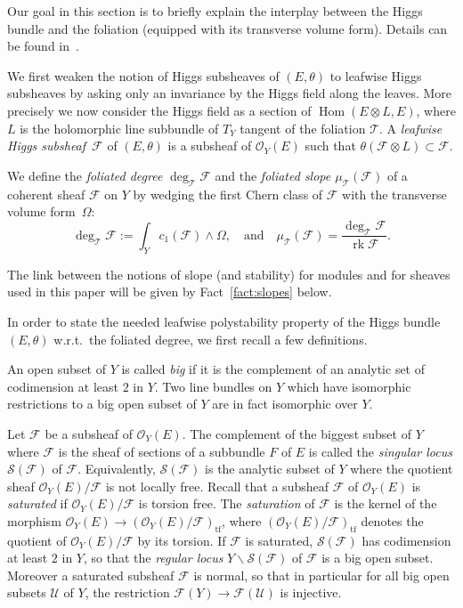 \documentclass[JEP,XML,SOM,Unicode,NoFloatCountersInSection]{cedram}
\let\mathcal\mathscr
\newcommand{\citestar}[3]{\cite[#3]{#1}}
\theoremstyle{plain}
\theoremstyle{definition}
\DeclareMathOperator{\Hom}{Hom}
\DeclareMathOperator{\rk}{rk}
\newcommand{\rtf}{\mathrm{tf}}
\newcommand{\cF}{\mathcal{F}}
\newcommand{\cO}{\mathcal{O}}
\newcommand{\cS}{\mathcal{S}}
\newcommand{\cT}{\mathcal{T}}
\newcommand{\cU}{\mathcal{U}}
\begin{document}
Our goal in this section is to briefly explain the interplay between the Higgs bundle and the
foliation (equipped with its transverse volume form).
Details can be found in~\citestar{KM}*{}.

We first weaken the notion of Higgs subsheaves of $(E,\theta)$ to leafwise Higgs subsheaves by
asking only an
invariance by the Higgs field along the leaves. More \hbox{precisely} we now consider the
Higgs field as a section of $\Hom(E\otimes L,E)$,
where $L$ is the holomorphic
line subbundle of $T_Y$ tangent of the foliation $\cT$.
A \emph{leafwise Higgs subsheaf}~$\cF$ of
$(E,\theta)$ is a subsheaf of $\cO_Y(E)$ such that $\theta(\cF\otimes L)\subset \cF$.

We define the \emph{foliated degree} $\deg_\cT\cF$ and the {\em
foliated slope $\mu_\cT(\cF)$} of a coherent sheaf
$\cF$ on $Y$ by
wedging the first Chern class of $\cF$ with the transverse volume form~$\Omega$:
$$
\deg_\cT\cF:=\int_Y c_1(\cF)\wedge\Omega, \quad\mbox{and}\quad \mu_\cT(\cF)=\frac{\deg_\cT\cF}{\rk \cF}.
$$

The link between the notions of slope (and stability) for modules and for sheaves used in
this paper will be given by Fact~\ref{fact:slopes} below.

In order to state the needed leafwise polystability property of the Higgs bundle $(E,\theta)$ w.r.t.\ the
foliated degree, we first recall a few definitions.

An open subset of $Y$ is called \emph{big} if it is the complement of an analytic set of
codimension at least $2$ in $Y$. Two line bundles on $Y$ which have isomorphic restrictions
to a big open subset of $Y$ are in fact isomorphic over $Y$.

Let $\cF$ be a subsheaf of $\cO_Y(E)$. The complement of the biggest subset of $Y$ where $\cF$ is the
sheaf of sections of a subbundle $F$ of $E$ is called the \emph{singular locus} $\cS(\cF)$ of
$\cF$. Equivalently, $\cS(\cF)$ is the analytic subset of $Y$ where the quotient sheaf $\cO_Y(E)/\cF$ is not locally
free. Recall that a subsheaf $\cF$ of $\cO_Y(E)$ is \emph{saturated} if $\cO_Y(E)/\cF$ is torsion
free. The \emph{saturation} of $\cF$ is the kernel of the morphism $\cO_Y(E) \to
(\cO_Y(E)/\cF)_\rtf$, where
$(\cO_Y(E)/\cF)_\rtf$ denotes the quotient of $\cO_Y(E)/\cF$ by its torsion. If $\cF$ is
saturated, $\cS(\cF)$ has codimension at least $2$ in $Y$, so that the \emph{regular
locus} $Y\backslash\cS(\cF)$ of $\cF$ is a big open subset. Moreover a saturated subsheaf $\cF$ is
normal, so that in particular for all big open subsets $\cU$ of $Y$, the restriction
$\cF(Y)\to\cF(\cU)$ is injective.
\end{document}
